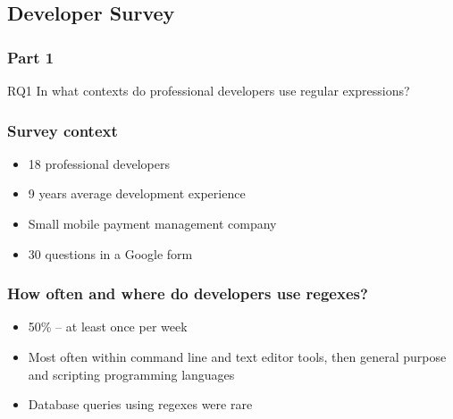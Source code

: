 \subsection{Developer Survey}

\begin{frame}
\frametitle{Part 1}

\begin{block}{RQ1}
In what contexts do professional developers use regular expressions?
\end{block}
\end{frame}

\begin{frame}
\frametitle{Survey context}

\begin{itemize}
	\item 18 professional developers 
	\item 9 years average development experience
	\item Small mobile payment management company
	\item 30 questions in a Google form
\end{itemize}
\end{frame}

\begin{frame}
\frametitle{How often and where do developers use regexes?}

\begin{itemize}
	\item 50\%  -- at least once per week
	\item<2-> Most often within command line and text editor tools, then general purpose and scripting programming languages
	\item<2-> Database queries using regexes were rare
\end{itemize}
\end{frame}


